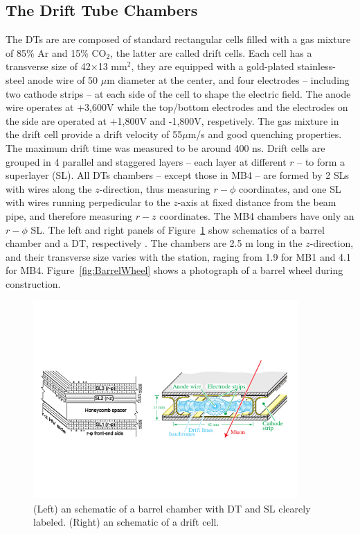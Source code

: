 \subsection{The Drift Tube Chambers}
The DTs are are composed of standard rectangular cells filled with a gas mixture of
85\% Ar and 15\% CO$_{2}$, the latter are called drift cells. Each cell
has a transverse size of 42$\times$13 mm$^{2}$, they are equipped with
a gold-plated stainless-steel anode wire of 50 $\mu$m diameter at the
center, and four electrodes -- including two cathode strips -- at each
side of the cell to shape the electric field. The anode wire operates
at +3,600\unit{V} while the top/bottom electrodes and the electrodes
on the side are operated at +1,800\unit{V} and -1,800\unit{V},
respetively. The gas mixture in the drift cell provide a drift
velocity of 55$\mu$m/s and good quenching properties. The maximum
drift time was measured to be around 400 ns. Drift cells are grouped
in 4 parallel and staggered layers -- each layer at different $r$ --
to form a superlayer (SL). All DTs chambers -- except those in MB4 -- are formed by 2 SLs
with wires along the $z$-direction, thus measuring $r-\phi$
coordinates, and one SL with wires running perpedicular to the
$z$-axis at fixed distance from the beam pipe, and therefore measuring
$r-z$ coordinates. The MB4 chambers have only an $r-\phi$
SL. The left and right panels of Figure~\ref{fig:DTandSL} show schematics of a barrel chamber and
a DT, respectively . The
chambers are 2.5 m long in the $z$-direction, and their transverse
size varies with the station, raging from 1.9 for MB1 and 4.1 for
MB4. Figure~\ref{fig:BarrelWheel} shows a photograph of a barrel wheel during
construction.
\begin{figure}
 \centering
\includegraphics[width=0.9\textwidth]{CMS_DetectorFigures/DriftTube.pdf}
\caption{(Left) an schematic of a barrel chamber with DT and SL
  clearely labeled. (Right) an schematic of a drift cell.\label{fig:DTandSL}}
\end{figure}
